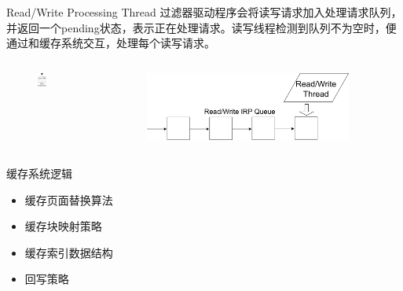 \documentclass[compress]{beamer}
\begin{document}
\begin{frame}{Read/Write Processing Thread}
过滤器驱动程序会将读写请求加入处理请求队列，并返回一个pending状态，表示正在处理请求。读写线程检测到队列不为空时，便通过和缓存系统交互，处理每个读写请求。
\vspace{1cm}
    \begin{columns}
    \begin{column}{0.5\textwidth}
        \begin{figure}
        \includegraphics[width=0.3\textwidth]{../graph/df-rw}
        \end{figure}
    \end{column}
    \begin{column}{0.5\textwidth}
        \begin{figure}
        \includegraphics[width=0.9\textwidth]{../graph/df-rw-thread}
        \end{figure}
    \end{column}
    \end{columns}
\end{frame}

\begin{frame}{缓存系统逻辑}
\begin{itemize}
\item 缓存页面替换算法
\item 缓存块映射策略
\item 缓存索引数据结构
\item 回写策略
\end{itemize}
\end{frame}
\end{document}
